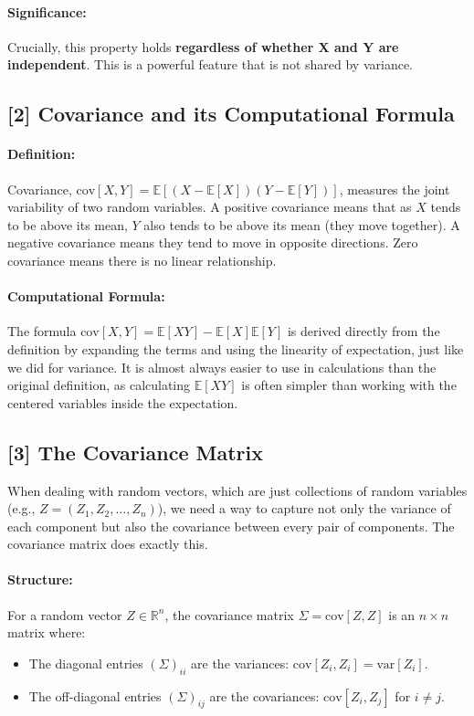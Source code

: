 \documentclass[11pt,a4paper]{article}
\newcommand{\noteTarget}[1]{\hypertarget{#1}{}}
\begin{document}
\paragraph{Significance:} Crucially, this property holds \textbf{regardless of whether X and Y are independent}. This is a powerful feature that is not shared by variance.

\subsection*{\noteTarget{2} [2] Covariance and its Computational Formula}
\paragraph{Definition:} Covariance, $\text{cov}[X,Y] = \mathbb{E}[(X - \mathbb{E}[X])(Y - \mathbb{E}[Y])]$, measures the joint variability of two random variables. A positive covariance means that as $X$ tends to be above its mean, $Y$ also tends to be above its mean (they move together). A negative covariance means they tend to move in opposite directions. Zero covariance means there is no linear relationship.
\paragraph{Computational Formula:} The formula $\text{cov}[X,Y] = \mathbb{E}[XY] - \mathbb{E}[X]\mathbb{E}[Y]$ is derived directly from the definition by expanding the terms and using the linearity of expectation, just like we did for variance. It is almost always easier to use in calculations than the original definition, as calculating $\mathbb{E}[XY]$ is often simpler than working with the centered variables inside the expectation.

\subsection*{\noteTarget{3} [3] The Covariance Matrix}
When dealing with random vectors, which are just collections of random variables (e.g., $Z = (Z_1, Z_2, \dots, Z_n)$), we need a way to capture not only the variance of each component but also the covariance between every pair of components. The covariance matrix does exactly this.
\paragraph{Structure:} For a random vector $Z \in \mathbb{R}^n$, the covariance matrix $\Sigma = \text{cov}[Z,Z]$ is an $n \times n$ matrix where:
\begin{itemize}
    \item The diagonal entries $(\Sigma)_{ii}$ are the variances: $\text{cov}[Z_i, Z_i] = \text{var}[Z_i]$.
    \item The off-diagonal entries $(\Sigma)_{ij}$ are the covariances: $\text{cov}[Z_i, Z_j]$ for $i \neq j$.
\end{itemize}
\end{document}
